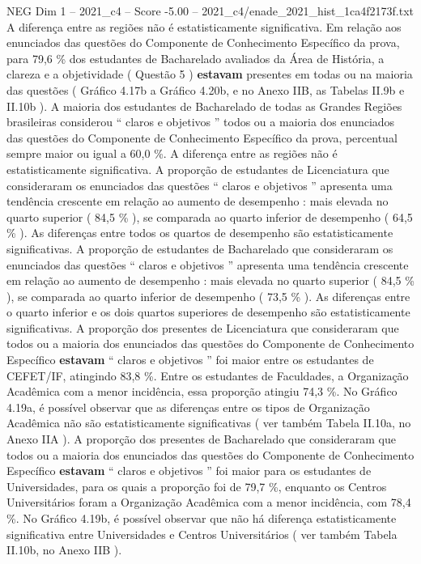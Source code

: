 \begin{textsample}{NEG Dim 1 – 2021\_c4 – Score -5.00 – 2021\_c4/enade\_2021\_hist\_1ca4f2173f.txt}
A diferença entre as regiões não é estatisticamente significativa.
Em relação aos enunciados das questões do Componente de Conhecimento Específico da prova, para 79,6 \% dos estudantes de Bacharelado avaliados da Área de História, a clareza e a objetividade ( Questão 5 ) \textbf{estavam} presentes em todas ou na maioria das questões ( Gráfico 4.17b a Gráfico 4.20b, e no Anexo IIB, as Tabelas II.9b e II.10b ).
A maioria dos estudantes de Bacharelado de todas as Grandes Regiões brasileiras considerou “ claros e objetivos ” todos ou a maioria dos enunciados das questões do Componente de Conhecimento Específico da prova, percentual sempre maior ou igual a 60,0 \%.
A diferença entre as regiões não é estatisticamente significativa.
A proporção de estudantes de Licenciatura que consideraram os enunciados das questões “ claros e objetivos ” apresenta uma tendência crescente em relação ao aumento de desempenho : mais elevada no quarto superior ( 84,5 \% ), se comparada ao quarto inferior de desempenho ( 64,5 \% ).
As diferenças entre todos os quartos de desempenho são estatisticamente significativas.
A proporção de estudantes de Bacharelado que consideraram os enunciados das questões “ claros e objetivos ” apresenta uma tendência crescente em relação ao aumento de desempenho : mais elevada no quarto superior ( 84,5 \% ), se comparada ao quarto inferior de desempenho ( 73,5 \% ).
As diferenças entre o quarto inferior e os dois quartos superiores de desempenho são estatisticamente significativas.
A proporção dos presentes de Licenciatura que consideraram que todos ou a maioria dos enunciados das questões do Componente de Conhecimento Específico \textbf{estavam} “ claros e objetivos ” foi maior entre os estudantes de CEFET/IF, atingindo 83,8 \%.
Entre os estudantes de Faculdades, a Organização Acadêmica com a menor incidência, essa proporção atingiu 74,3 \%.
No Gráfico 4.19a, é possível observar que as diferenças entre os tipos de Organização Acadêmica não são estatisticamente significativas ( ver também Tabela II.10a, no Anexo IIA ).
A proporção dos presentes de Bacharelado que consideraram que todos ou a maioria dos enunciados das questões do Componente de Conhecimento Específico \textbf{estavam} “ claros e objetivos ” foi maior para os estudantes de Universidades, para os quais a proporção foi de 79,7 \%, enquanto os Centros Universitários foram a Organização Acadêmica com a menor incidência, com 78,4 \%.
No Gráfico 4.19b, é possível observar que não há diferença estatisticamente significativa entre Universidades e Centros Universitários ( ver também Tabela II.10b, no Anexo IIB ).

\end{textsample}
